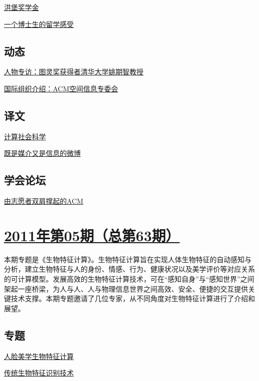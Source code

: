 \documentclass[a4paper]{article}
\begin{document}
\href{http://history.ccf.org.cn/resources/1190201776262/2011/06/13/11.pdf}{洪堡奖学金}

\href{http://history.ccf.org.cn/resources/1190201776262/2011/06/13/12.pdf}{一个博士生的留学感受}

\subsection{动态}
\href{http://history.ccf.org.cn/resources/1190201776262/2011/06/13/13.pdf}{人物专访：图灵奖获得者清华大学姚期智教授}

\href{http://history.ccf.org.cn/resources/1190201776262/2011/06/13/14.pdf}{国际组织介绍：ACM空间信息专委会}

\subsection{译文}
\href{http://history.ccf.org.cn/resources/1190201776262/2011/06/13/16.pdf}{计算社会科学}

\href{http://history.ccf.org.cn/resources/1190201776262/2011/06/13/15.pdf}{既是媒介又是信息的微博}

\subsection{学会论坛}
\href{http://history.ccf.org.cn/resources/1190201776262/2011/06/13/17.pdf}{由志愿者双肩撑起的ACM}


\section{\href{http://history.ccf.org.cn/sites/ccf/jsjtbbd.jsp?contentId=2611154939231}{\textbf{2011年第05期（总第63期）}}}
本期专题是《生物特征计算》。生物特征计算旨在实现人体生物特征的自动感知与分析，建立生物特征与人的身份、情感、行为、健康状况以及美学评价等对应关系的可计算模型。发展高效的生物特征计算技术，可在“感知自身”与“感知世界”之间架起一座桥梁，为人与人、人与物理信息世界之间高效、安全、便捷的交互提供关键技术支撑。本期专题邀请了几位专家，从不同角度对生物特征计算进行了介绍和展望。
\subsection{专题}
\href{http://history.ccf.org.cn/resources/1190201776262/2011/05/17/6.pdf}{人脸美学生物特征计算}

\href{http://history.ccf.org.cn/resources/1190201776262/2011/05/17/2.pdf}{传统生物特征识别技术}
\end{document}
